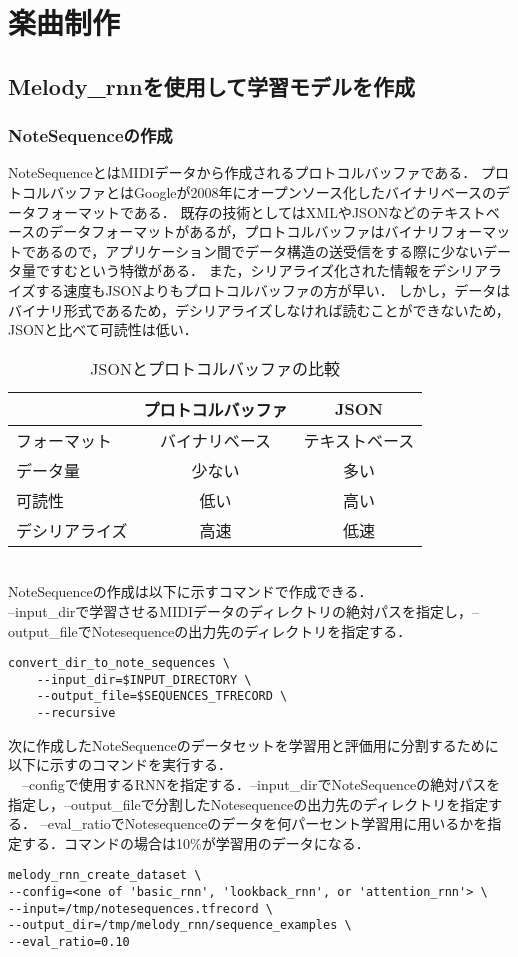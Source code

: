 \chapter{楽曲制作}
\section{Melody\_rnnを使用して学習モデルを作成}
\subsection{NoteSequenceの作成}
NoteSequenceとはMIDIデータから作成されるプロトコルバッファである．
プロトコルバッファとはGoogleが2008年にオープンソース化したバイナリベースのデータフォーマットである．
既存の技術としてはXMLやJSONなどのテキストベースのデータフォーマットがあるが，プロトコルバッファはバイナリフォーマットであるので，アプリケーション間でデータ構造の送受信をする際に少ないデータ量ですむという特徴がある．
また，シリアライズ化された情報をデシリアライズする速度もJSONよりもプロトコルバッファの方が早い．
しかし，データはバイナリ形式であるため，デシリアライズしなければ読むことができないため，JSONと比べて可読性は低い．
\begin{table}[h]
\begin{center}
\caption{JSONとプロトコルバッファの比較}
\label{tab:JSONとプロトコルバッファの比較}
\begin{tabular}{|l|c|c|}
\hline
    & プロトコルバッファ & JSON\\\hline
    \hline
    フォーマット & バイナリベース & テキストベース\\
    \hline
    データ量 & 少ない & 多い\\
    \hline
    可読性 & 低い & 高い\\
    \hline
    デシリアライズ & 高速 & 低速\\
    \hline
\end{tabular}
\end{center}
\end{table}\\
NoteSequenceの作成は以下に示すコマンドで作成できる．\\
--input\_dirで学習させるMIDIデータのディレクトリの絶対パスを指定し，--output\_fileでNotesequenceの出力先のディレクトリを指定する．
\begin{lstlisting}[basicstyle=\ttfamily\footnotesize，frame=single]
    convert_dir_to_note_sequences \
    --input_dir=$INPUT_DIRECTORY \
    --output_file=$SEQUENCES_TFRECORD \
    --recursive
\end{lstlisting}
\newpage
次に作成したNoteSequenceのデータセットを学習用と評価用に分割するために以下に示すのコマンドを実行する．\\
　--configで使用するRNNを指定する．--input\_dirでNoteSequenceの絶対パスを指定し，--output\_fileで分割したNotesequenceの出力先のディレクトリを指定する．
--eval\_ratioでNotesequenceのデータを何パーセント学習用に用いるかを指定する．コマンドの場合は10\%が学習用のデータになる．
\begin{lstlisting}[basicstyle=\ttfamily\footnotesize,frame=single]
melody_rnn_create_dataset \
--config=<one of 'basic_rnn', 'lookback_rnn', or 'attention_rnn'> \
--input=/tmp/notesequences.tfrecord \
--output_dir=/tmp/melody_rnn/sequence_examples \
--eval_ratio=0.10
\end{lstlisting}

